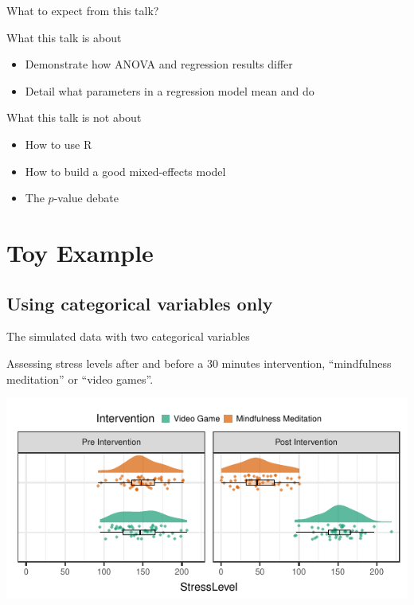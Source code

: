 \documentclass{beamer}
\begin{document}
\begin{frame}{What to expect from this talk?}

  \vfill
  \begin{block}{What this talk is about}
    \begin{itemize}
      \item Demonstrate how ANOVA and regression results differ
      \item Detail what parameters in a regression model mean and do
    \end{itemize}
  \end{block}
  \vfill
  \pause
  \begin{block}{What this talk is not about}
    \begin{itemize}
      \item How to use R
      \item How to build a good mixed-effects model
      \item The $p$-value debate
    \end{itemize}
  \end{block}
  \vfill

\end{frame}

\section{Toy Example}

\subsection{Using categorical variables only}

\begin{frame}{The simulated data with two categorical variables}
  
  \vfill
  Assessing stress levels after and before a 30 minutes intervention, ``mindfulness meditation'' or ``video games''.
  \vfill
  \pause
  \begin{center}
  \includegraphics{../src/CategoricalRaincloud.pdf}
  \end{center}
  \vfill

\end{frame}
\end{document}

